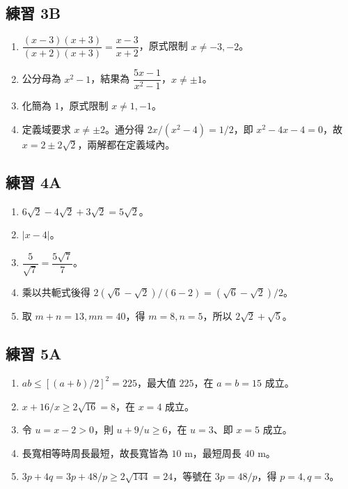 \documentclass[11pt,a4paper]{article}
\providecommand{\tightlist}{%
  \setlength{\itemsep}{0pt}\setlength{\parskip}{0pt}}
\begin{document}
\subsection{練習 3B}\label{ux7df4ux7fd2-3b-1}

\begin{enumerate}
\def\labelenumi{\arabic{enumi}.}
\tightlist
\item
  \(\dfrac{(x-3)(x+3)}{(x+2)(x+3)}=\boxed{\dfrac{x-3}{x+2}}\)，原式限制 \(\boxed{x\ne-3,-2}\)。
\item
  公分母為 \(x^2-1\)，結果為 \(\boxed{\dfrac{5x-1}{x^2-1}}\)，\(x\ne\pm1\)。
\item
  化簡為 \(\boxed1\)，原式限制 \(\boxed{x\ne1,-1}\)。
\item
  定義域要求 \(x\ne\pm2\)。通分得 \(2x/(x^2-4)=1/2\)，即 \(x^2-4x-4=0\)，故 \(\boxed{x=2\pm2\sqrt2}\)，兩解都在定義域內。
\end{enumerate}

\subsection{練習 4A}\label{ux7df4ux7fd2-4a-1}

\begin{enumerate}
\def\labelenumi{\arabic{enumi}.}
\tightlist
\item
  \(6\sqrt2-4\sqrt2+3\sqrt2=\boxed{5\sqrt2}\)。
\item
  \(\boxed{|x-4|}\)。
\item
  \(\dfrac5{\sqrt7}=\boxed{\dfrac{5\sqrt7}{7}}\)。
\item
  乘以共軛式後得 \(2(\sqrt6-\sqrt2)/(6-2)=\boxed{(\sqrt6-\sqrt2)/2}\)。
\item
  取 \(m+n=13,mn=40\)，得 \(m=8,n=5\)，所以 \(\boxed{2\sqrt2+\sqrt5}\)。
\end{enumerate}

\subsection{練習 5A}\label{ux7df4ux7fd2-5a-1}

\begin{enumerate}
\def\labelenumi{\arabic{enumi}.}
\tightlist
\item
  \(ab\le[(a+b)/2]^2=225\)，最大值 \(\boxed{225}\)，在 \(a=b=15\) 成立。
\item
  \(x+16/x\ge2\sqrt{16}=\boxed8\)，在 \(x=4\) 成立。
\item
  令 \(u=x-2>0\)，則 \(u+9/u\ge\boxed6\)，在 \(u=3\)、即 \(x=5\) 成立。
\item
  長寬相等時周長最短，故長寬皆為 \(10\) m，最短周長 \(\boxed{40\text{ m}}\)。
\item
  \(3p+4q=3p+48/p\ge2\sqrt{144}=\boxed{24}\)，等號在 \(3p=48/p\)，得 \(p=4,q=3\)。
\end{enumerate}
\end{document}
